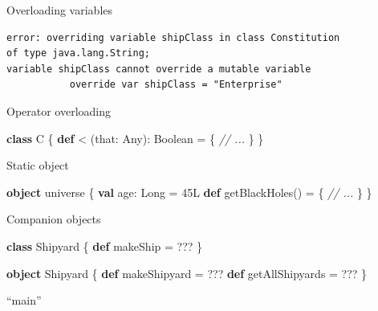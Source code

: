 \documentclass[ignorenonframetext,]{beamer}
\newenvironment{Shaded}{\begin{snugshade}}{\end{snugshade}}
\newcommand{\KeywordTok}[1]{\textcolor[rgb]{0.13,0.29,0.53}{\textbf{#1}}}
\newcommand{\CommentTok}[1]{\textcolor[rgb]{0.56,0.35,0.01}{\textit{#1}}}
\newcommand{\FunctionTok}[1]{\textcolor[rgb]{0.00,0.00,0.00}{#1}}
\newcommand{\NormalTok}[1]{#1}
\begin{document}
\begin{frame}[fragile]
\begin{block}{Overloading variables}
\begin{verbatim}
error: overriding variable shipClass in class Constitution 
of type java.lang.String;
variable shipClass cannot override a mutable variable
           override var shipClass = "Enterprise"
\end{verbatim}

\end{block}

\begin{block}{Operator overloading}

\begin{Shaded}
\begin{Highlighting}[]
\KeywordTok{class}\NormalTok{ C \{}
    \KeywordTok{def}\NormalTok{ < (that: Any): Boolean = \{}
        \CommentTok{// ...}
\NormalTok{    \}}
\NormalTok{\}}
\end{Highlighting}
\end{Shaded}

\end{block}

\begin{block}{Static object}

\begin{Shaded}
\begin{Highlighting}[]
\KeywordTok{object}\NormalTok{ universe \{}
    \KeywordTok{val}\NormalTok{ age: Long = 45L}
    \KeywordTok{def} \FunctionTok{getBlackHoles}\NormalTok{() = \{}
        \CommentTok{// ...}
\NormalTok{    \}}
\NormalTok{\}}
\end{Highlighting}
\end{Shaded}

\end{block}

\begin{block}{Companion objects}

\begin{Shaded}
\begin{Highlighting}[]
\KeywordTok{class}\NormalTok{ Shipyard \{}
  \KeywordTok{def}\NormalTok{ makeShip = ???}
\NormalTok{\}}

\KeywordTok{object}\NormalTok{ Shipyard \{}
  \KeywordTok{def}\NormalTok{ makeShipyard = ???}
  \KeywordTok{def}\NormalTok{ getAllShipyards = ???}
\NormalTok{\}}
\end{Highlighting}
\end{Shaded}

\end{block}

\begin{block}{``main''}


\end{block}
\end{frame}
\end{document}
